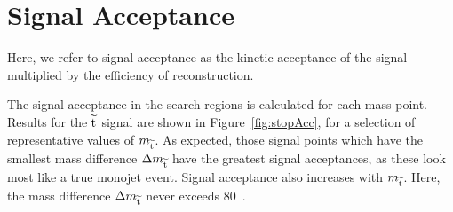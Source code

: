 \section{Signal Acceptance}
\label{sec:sigAccep}

Here, we refer to signal acceptance as the kinetic acceptance of the signal multiplied by the efficiency of reconstruction. 

The signal acceptance in the search regions is calculated for each mass point. 
Results for the $\widetilde{{\rm t}}$ signal are shown in Figure~\ref{fig:stopAcc}, for a selection of representative values of $m_{\widetilde{{\rm t}}}$.
As expected, those signal points which have the smallest mass difference $\Delta m_{\widetilde{{\rm t}}}$ have the greatest signal acceptances, as these look most like a true monojet event. 
Signal acceptance also increases with $m_{\widetilde{{\rm t}}}$.
Here, the mass difference $\Delta m_{\widetilde{{\rm t}}}$ never exceeds 80~\GeV.


